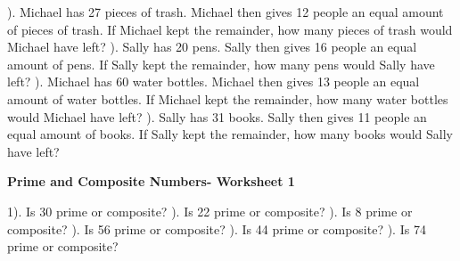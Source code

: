 \documentclass{article}%
\begin{document}
\newline%
). Michael has 27 pieces of trash. Michael then gives 12 people an equal amount of pieces of trash. If Michael kept the remainder, how many pieces of trash would Michael have left?%
\newline%
\newline%
). Sally has 20 pens. Sally then gives 16 people an equal amount of pens. If Sally kept the remainder, how many pens would Sally have left?%
\newline%
\newline%
). Michael has 60 water bottles. Michael then gives 13 people an equal amount of water bottles. If Michael kept the remainder, how many water bottles would Michael have left?%
\newline%
\newline%
). Sally has 31 books. Sally then gives 11 people an equal amount of books. If Sally kept the remainder, how many books would Sally have left?%
\newline%
\newline%
\newline%
\pagebreak%
\large%
\begin{center}%
\textbf{Prime and Composite Numbers- Worksheet 1}%
\newline%
\end{center} \normalsize%
1). Is 30 prime or composite?%
\newline%
\newline%
). Is 22 prime or composite?%
\newline%
\newline%
). Is 8 prime or composite?%
\newline%
\newline%
). Is 56 prime or composite?%
\newline%
\newline%
). Is 44 prime or composite?%
\newline%
\newline%
). Is 74 prime or composite?%
\newline%
\newline%
\end{document}
